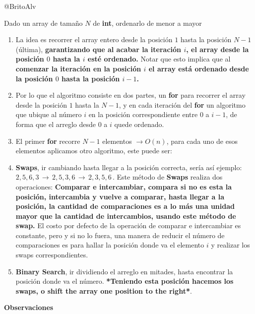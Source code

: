 \documentclass[14pt]{extarticle}
\begin{document}
@BritoAlv


\begin{tcolorbox}[colback=blue!5!white,colframe=blue!75!black, title = Insertion Sort]
Dado un array de tamaño $N$ de \textbf{int}, ordenarlo de menor a mayor    
\end{tcolorbox}


\begin{enumerate}
    \item La idea es recorrer el array entero desde la posición $1$ hasta la posición $N-1$ (última), \textbf{garantizando que al acabar la iteración $i$, el array desde la posición $0$ hasta la $i$ esté ordenado.} Notar que esto implica que al \textbf{comenzar la iteración en la posición $i$ el array está ordenado desde la posición $0$ hasta la posición $i-1$.}
    \item Por lo que el algoritmo consiste en dos partes, un \textbf{for} para recorrer el array desde la posición $1$ hasta la $N-1$, y en cada iteración del \textbf{for} un algoritmo que ubique al número $i$ en la posición correspondiente entre $0$ a $i-1$, de forma que el arreglo desde $0$ a $i$ quede ordenado.
    \item El primer \textbf{for} recorre $N-1$ elementos $\to O(n)$, para cada uno de esos elementos aplicamos otro algoritmo, este puede ser:
    \item \textbf{Swaps}, ir cambiando hasta llegar a la posición correcta, sería así ejemplo: $2,5,6,3 \, \to \, 2,5,3,6 \, \to \, 2,3,5,6 \,$. Este método de \textbf{Swaps} realiza dos operaciones: \textbf{Comparar e intercambiar, compara si no es esta la posición, intercambia y vuelve a comparar, hasta llegar a la posición, la cantidad de comparaciones es a lo más una unidad mayor que la cantidad de intercambios, usando este método de swap.} El costo por defecto de la operación de comparar e intercambiar es constante, pero y si no lo fuera, una manera de reducir el número de comparaciones es  para hallar la posición donde va el elemento $i$ y realizar los swaps correspondientes. 
    \item \textbf{Binary Search}, ir dividiendo el arreglo en mitades, hasta encontrar la posición donde va el número. \textbf{*Teniendo esta posición hacemos los swaps, o shift the array one position to the right*}.
         
\end{enumerate}
\begin{center}
    \textbf{Observaciones}
\end{center}
\end{document}
